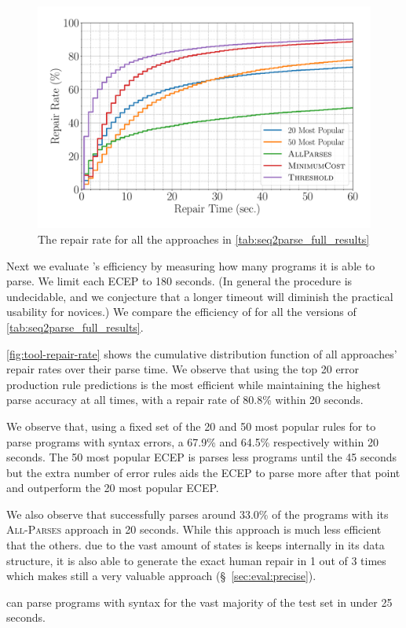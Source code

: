 \begin{figure}[t]
  \centering
  \includegraphics[width=0.8\linewidth]{tool-repair-rate.pdf}
  \caption{The repair rate for all the approaches in
  \autoref{tab:seq2parse_full_results}}
  \label{fig:tool-repair-rate}
\end{figure}

Next we evaluate \toolname's efficiency by measuring how many programs it is
able to parse. We limit each ECEP to 180 seconds. (In general the procedure is
undecidable, and we conjecture that a longer timeout will diminish the practical
usability for novices.) We compare the efficiency of \toolname for all the
versions of \autoref{tab:seq2parse_full_results}.

\autoref{fig:tool-repair-rate} shows the cumulative distribution function of all
\toolname approaches' repair rates over their parse time. We observe that using
the top 20 error production rule predictions is the most efficient while
maintaining the highest parse accuracy at all times, with a repair rate of
80.8\% within 20 seconds.

We observe that, using a fixed set of the 20 and 50 most popular rules for
\toolname to parse programs with syntax errors, a 67.9\% and 64.5\% respectively
within 20 seconds. The 50 most popular ECEP is parses less programs until the 45
seconds but the extra number of error rules aids the ECEP to parse more after
that point and outperform the 20 most popular ECEP.

We also observe that \toolname successfully parses around 33.0\% of the programs
with its \textsc{All-Parses} approach in 20 seconds. While this approach is much
less efficient that the others. due to the vast amount of states is keeps
internally in its data structure, it is also able to generate the exact human
repair in 1 out of 3 times which makes still a very valuable approach
(\S~\ref{sec:eval:precise}).

\begin{framed}
  \noindent \toolname can parse programs with syntax for the vast majority of
  the test set in under 25 seconds.
\end{framed}
